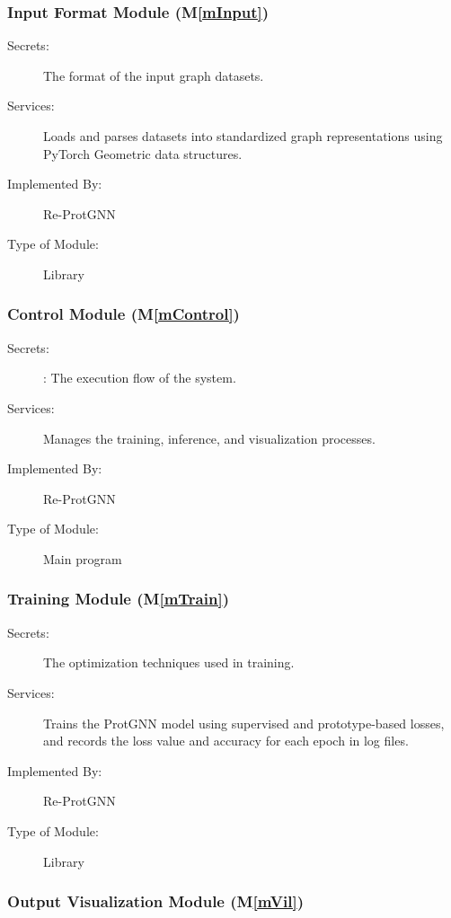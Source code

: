 \documentclass[12pt, titlepage]{article}
\newcommand{\mref}[1]{M\ref{#1}}
\begin{document}
\subsubsection{Input Format Module (\mref{mInput})}

\begin{description}
\item[Secrets:]The format of the input graph datasets.
\item[Services:]Loads and parses datasets into standardized graph representations using PyTorch Geometric data structures.
\item[Implemented By:] Re-ProtGNN
\item[Type of Module:] Library
\end{description}

\subsubsection{Control Module (\mref{mControl})}

\begin{description}
\item[Secrets:]: The execution flow of the system.

\item[Services:]Manages the training, inference, and visualization processes.
\item[Implemented By:] Re-ProtGNN
\item[Type of Module:] Main program
\end{description}

\subsubsection{Training Module
 (\mref{mTrain})}

\begin{description}
\item[Secrets:] The optimization techniques used in training.

\item[Services:] Trains the ProtGNN model using supervised and prototype-based losses, and records the loss value and accuracy for each epoch in log files.

\item[Implemented By:] Re-ProtGNN
\item[Type of Module:] Library
\end{description}

\subsubsection{Output Visualization Module
 (\mref{mVil})}
\end{document}
